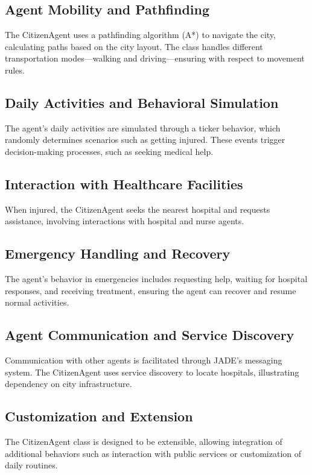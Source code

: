 \documentclass[conference]{IEEEtran}
\begin{document}
  \subsection{Agent Mobility and Pathfinding}
  The CitizenAgent uses a pathfinding algorithm (A*) to navigate the city, calculating paths based on the city layout. The class handles different transportation modes—walking and driving—ensuring with respect to movement rules.
  
  \subsection{Daily Activities and Behavioral Simulation}
  The agent's daily activities are simulated through a ticker behavior, which randomly determines scenarios such as getting injured. These events trigger decision-making processes, such as seeking medical help.
  
  \subsection{Interaction with Healthcare Facilities}
  When injured, the CitizenAgent seeks the nearest hospital and requests assistance, involving interactions with hospital and nurse agents.
  
  \subsection{Emergency Handling and Recovery}
  The agent's behavior in emergencies includes requesting help, waiting for hospital responses, and receiving treatment, ensuring the agent can recover and resume normal activities.
  
  \subsection{Agent Communication and Service Discovery}
  Communication with other agents is facilitated through JADE's messaging system. The CitizenAgent uses service discovery to locate hospitals, illustrating dependency on city infrastructure.
  
  \subsection{Customization and Extension}
  The CitizenAgent class is designed to be extensible, allowing integration of additional behaviors such as interaction with public services or customization of daily routines.
  
\end{document}

